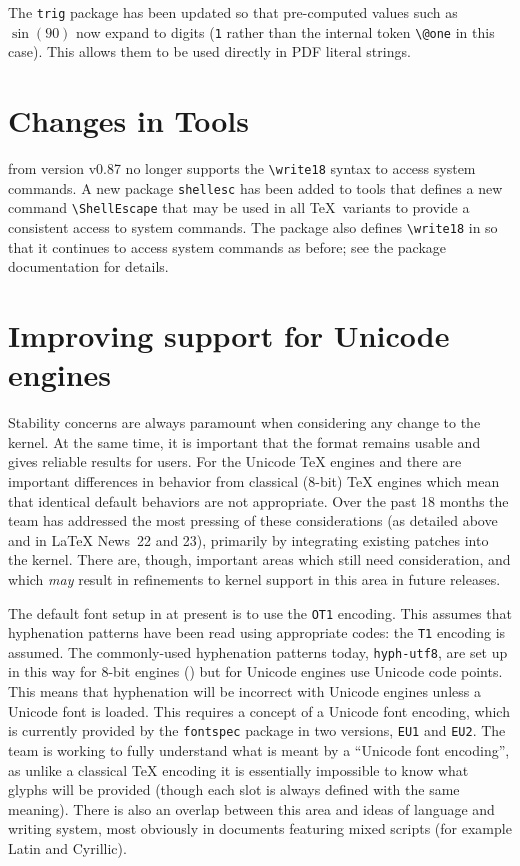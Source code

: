 \documentclass{ltnews}
\providecommand\pkg[1]{\texttt{#1}}
\begin{document}
The \pkg{trig} package has been updated so that pre-computed values
such as $\sin(90)$ now expand to digits (\texttt{1} rather than the
internal token \verb|\@one| in this case). This allows them to be used
directly in PDF literal strings.

\section{Changes in Tools}

 from version v0.87 no longer supports the
\verb|\write18| syntax to access system commands. A new package
\pkg{shellesc} has been added to \textsf{tools} that defines a new
command \verb|\ShellEscape| that may be used in all \TeX\ variants to
provide a consistent access to system commands. The package also
defines \verb|\write18| in   so that it continues to access
system commands as before; see the package documentation for details.

\section{Improving support for Unicode engines}

Stability concerns are always paramount when considering any change to
the \LaTeXe{} kernel. At the same time, it is important that the format
remains usable and gives reliable results for users. For the Unicode
\TeX{} engines  and  there are important
differences in behavior from classical ($8$-bit) \TeX{} engines which
mean that identical default behaviors are not appropriate. Over the
past 18 months the team has addressed the most pressing of these
considerations (as detailed above and in \LaTeX{} News~22 and 23),
primarily by integrating existing patches into the kernel. There are,
though, important areas which still need consideration, and which
\emph{may} result in refinements to kernel support in this area in
future releases.

The default font setup in \LaTeXe{} at present is to use the \texttt{OT1}
encoding. This assumes that hyphenation patterns have been read using
appropriate codes: the \texttt{T1} encoding is assumed. The commonly-used
hyphenation patterns today, \texttt{hyph-utf8}, are set up in this
way for $8$-bit engines () but for Unicode engines use
Unicode code points. This means that hyphenation will be incorrect
with Unicode engines unless a Unicode font is loaded. This requires
a concept of a Unicode font encoding, which is currently provided by
the \pkg{fontspec} package in two versions, \texttt{EU1} and
\texttt{EU2}. The team is working to fully understand what is meant
by a ``Unicode font encoding'', as unlike a classical \TeX{} encoding
it is essentially impossible to know what glyphs will be provided
(though each slot is always defined with the same meaning).  There
is also an overlap between this area and ideas of language and writing
system, most obviously in documents featuring mixed scripts (for example
Latin and Cyrillic).
\end{document}

